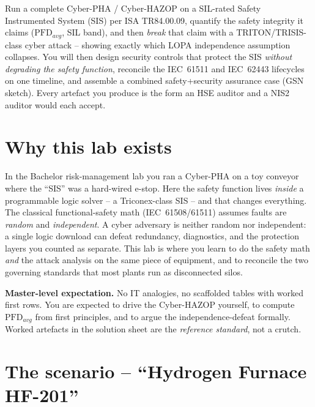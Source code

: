 \documentclass[11pt,a4paper]{article}
\begin{document}
\labheader

\begin{goalbox}
Run a complete Cyber-PHA / Cyber-HAZOP on a SIL-rated Safety Instrumented
System (SIS) per ISA TR84.00.09, quantify the safety integrity it claims
($\mathrm{PFD}_{avg}$, SIL band), and then \emph{break} that claim with a
TRITON/TRISIS-class cyber attack -- showing exactly which LOPA independence
assumption collapses. You will then design security controls that protect
the SIS \emph{without degrading the safety function}, reconcile the
IEC~61511 and IEC~62443 lifecycles on one timeline, and assemble a combined
safety+security assurance case (GSN sketch). Every artefact you produce is
the form an HSE auditor and a NIS2 auditor would each accept.
\end{goalbox}

\section*{Why this lab exists}

In the Bachelor risk-management lab you ran a Cyber-PHA on a toy conveyor
where the ``SIS'' was a hard-wired e-stop. Here the safety function lives
\emph{inside} a programmable logic solver -- a Triconex-class SIS -- and that
changes everything. The classical functional-safety math (IEC~61508/61511)
assumes faults are \emph{random} and \emph{independent}. A cyber adversary is
neither random nor independent: a single logic download can defeat redundancy,
diagnostics, and the protection layers you counted as separate. This lab is
where you learn to do the safety math \emph{and} the attack analysis on the
same piece of equipment, and to reconcile the two governing standards that
most plants run as disconnected silos.

\medskip\noindent
\textbf{Master-level expectation.} No IT analogies, no scaffolded tables with
worked first rows. You are expected to drive the Cyber-HAZOP yourself, to
compute $\mathrm{PFD}_{avg}$ from first principles, and to argue the
independence-defeat formally. Worked artefacts in the solution sheet are the
\emph{reference standard}, not a crutch.

\section*{The scenario -- ``Hydrogen Furnace HF-201''}
\end{document}
